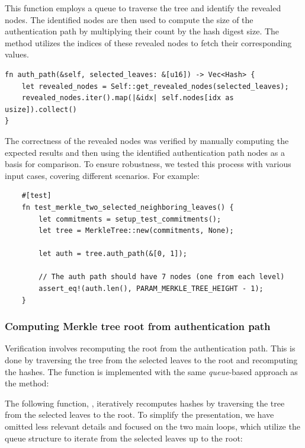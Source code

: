 \documentclass[11pt]{report}
\theoremstyle{definition}
\theoremstyle{plain}
\begin{document}
This function employs a queue to traverse the tree and identify the revealed nodes. The identified nodes are then used to compute the size of the authentication path by multiplying their count by the hash digest size. The  method utilizes the indices of these revealed nodes to fetch their corresponding values.

\begin{verbatim}
fn auth_path(&self, selected_leaves: &[u16]) -> Vec<Hash> {
    let revealed_nodes = Self::get_revealed_nodes(selected_leaves);
    revealed_nodes.iter().map(|&idx| self.nodes[idx as usize]).collect()
}
\end{verbatim}

The correctness of the revealed nodes was verified by manually computing the expected results and then using the identified authentication path nodes as a basis for comparison. To ensure robustness, we tested this process with various input cases, covering different scenarios. For example:

\begin{verbatim}
    #[test]
    fn test_merkle_two_selected_neighboring_leaves() {
        let commitments = setup_test_commitments();
        let tree = MerkleTree::new(commitments, None);

        let auth = tree.auth_path(&[0, 1]);

        // The auth path should have 7 nodes (one from each level)
        assert_eq!(auth.len(), PARAM_MERKLE_TREE_HEIGHT - 1);
    }
\end{verbatim}

\subsubsection{Computing Merkle tree root from authentication path}\label{sub:get_root_from_auth_path}
Verification involves recomputing the root from the authentication path. This is done by traversing the tree from the selected leaves to the root and recomputing the hashes. The function is implemented with the same \textit{queue}-based approach as the  method:

The following function, , iteratively recomputes hashes by traversing the tree from the selected leaves to the root. To simplify the presentation, we have omitted less relevant details and focused on the two main loops, which utilize the queue structure to iterate from the selected leaves up to the root:
\end{document}
